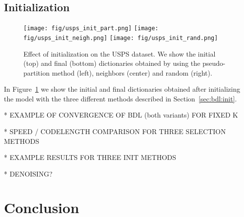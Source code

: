 \documentclass[twocolumn]{IEEEtran}
\theoremstyle{definition}
\begin{document}
\subsection{Initialization}
\begin{figure}[t]
\texttt{[image: fig/usps\_init\_part.png]} %
\texttt{[image: fig/usps\_init\_neigh.png]} %
\texttt{[image: fig/usps\_init\_rand.png]}
\caption{\label{fig:init} Effect of initialization on the USPS dataset. We show the initial (top) and final (bottom) dictionaries obtained by using the pseudo-partition method (left), neighbors (center) and random (right).}
\end{figure}
%

In Figure~\ref{fig:init} we show the initial and final dictionaries obtained after initializing the model with the three different methods described in Section~\ref{sec:bdl:init}.


* EXAMPLE OF CONVERGENCE OF BDL (both variants) FOR FIXED K

* SPEED / CODELENGTH COMPARISON FOR THREE SELECTION METHODS

* EXAMPLE RESULTS FOR THREE INIT METHODS

* DENOISING?

\section{Conclusion}
\label{sec:conclusion}
%



\end{document}
